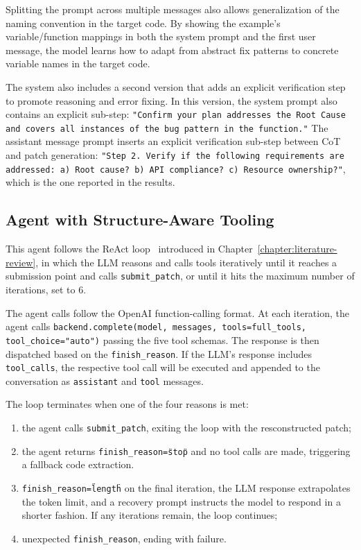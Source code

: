 Splitting the prompt across multiple messages also allows generalization of the naming convention in the target code. By showing the example's variable/function mappings in both the system prompt and the first user message, the model learns how to adapt from abstract fix patterns to concrete variable names in the target code.


The system also includes a second version that adds an explicit verification step to promote reasoning and error fixing.
In this version, the system prompt also contains an explicit sub-step: \texttt{"Confirm your plan addresses the Root Cause and covers all instances of the bug pattern in the function."} The assistant message prompt inserts an explicit verification sub-step between CoT and patch generation: \texttt{"Step 2. Verify if the following requirements are addressed: a) Root cause? b) API compliance? c) Resource ownership?"}, which is the one reported in the results. 

\subsection{Agent with Structure-Aware Tooling}

This agent follows the ReAct loop~\cite{yao2023react} introduced in Chapter~\ref{chapter:literature-review}, in which the LLM reasons and calls tools iteratively until it reaches a submission point and calls \texttt{submit\_patch}, or until it hits the maximum number of iterations, set to 6.

The agent calls follow the OpenAI function-calling format. 
At each iteration, the agent calls \texttt{backend.complete(model, messages, tools=full\_tools, tool\_choice="auto")} passing the five tool schemas. 
The response is then dispatched based on the \texttt{finish\_reason}.
If the LLM's response includes \texttt{tool\_calls}, the respective tool call will be executed and appended to the conversation as \texttt{assistant} and \texttt{tool} messages.

The loop terminates when one of the four reasons is met: 
\begin{enumerate}
    \item the agent calls \texttt{submit\_patch}, exiting the loop with the resconstructed patch;
    \item the agent returns \texttt{finish\_reason=\"stop\"} and no tool calls are made, triggering a fallback code extraction.
    \item \texttt{finish\_reason=\"length\"} on the final iteration, the LLM response extrapolates the token limit, and a recovery prompt instructs the model to respond in a shorter fashion. If any iterations remain, the loop continues;
    \item unexpected \texttt{finish\_reason}, ending with failure.
\end{enumerate}



